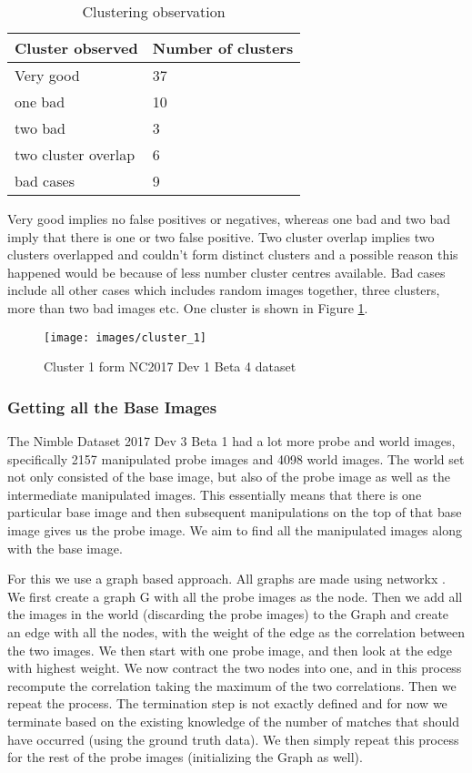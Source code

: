 \documentclass{article}
\begin{document}
\begin{table}[H]
\centering
\caption{Clustering observation}
\label{clust_obs}
\begin{tabular}{|l|l|}
  \hline
  Cluster observed    & Number of clusters \\
  \hline
  Very good              & 37                 \\
  one bad             & 10                 \\
  two bad             & 3                  \\
  two cluster overlap & 6                  \\
  bad cases           & 9                 \\
  \hline
\end{tabular}
\end{table}
Very good implies no false positives or negatives, whereas one bad and two bad imply that there is one or two false positive. Two cluster overlap implies two clusters overlapped and couldn't form distinct clusters and a possible reason this happened would be because of less number cluster centres available. Bad cases include all other cases which includes random images together, three clusters, more than two bad images etc. One cluster is shown in Figure \ref{fig:cluster}.

\begin{figure}[H]
  \centering
  \texttt{[image: images/cluster\_1]}
  \caption{Cluster 1 form NC2017 Dev 1 Beta 4 dataset}
  \label{fig:cluster}
\end{figure}

\subsubsection{Getting all the Base Images}
The Nimble Dataset 2017 Dev 3 Beta 1 had a lot more probe and world images, specifically 2157 manipulated probe images and 4098 world images. The world set not only consisted of the base image, but also of the probe image as well as the intermediate manipulated images. This essentially means that there is one particular base image and then subsequent manipulations on the top of that base image gives us the probe image. We aim to find all the manipulated images along with the base image.

For this we use a graph based approach. All graphs are made using networkx \cite{hagberg-2008-exploring}. We first create a graph G with all the probe images as the node. Then we add all the images in the world (discarding the probe images) to the Graph and create an edge with all the nodes, with the weight of the edge as the correlation between the two images. We then start with one probe image, and then look at the edge with highest weight. We now contract the two nodes into one, and in this process recompute the correlation taking the maximum of the two correlations. Then we repeat the process. The termination step is not exactly defined and for now we terminate based on the existing knowledge of the number of matches that should have occurred (using the ground truth data). We then simply repeat this process for the rest of the probe images (initializing the Graph as well).
\end{document}

